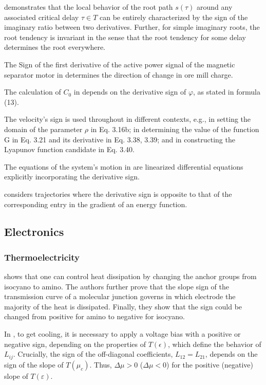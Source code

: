 \documentclass[11pt]{book}
\begin{document}
\cite{jarlebring2010invariance} demonstrates that the local behavior
of the root path $s\left(\tau\right)$ around any associated critical
delay $\tau\in T$ can be entirely characterized by the sign of the
imaginary ratio between two derivatives. Further, for simple imaginary
roots, the root tendency is invariant in the sense that the root tendency
for some delay determines the root everywhere.

The Sign of the first derivative of the active power signal of the
magnetic separator motor in \cite{alekseyev2014automated} determines
the direction of change in ore mill charge.

The calculation of $C_{0}$ in \cite{lumbreras2018stability} depends
on the derivative sign of $\varphi$, as stated in formula (13).

The velocity's sign is used throughout \cite{kikuuwe2018some} in
different contexts, e.g., in setting the domain of the parameter $\rho$
in Eq. 3.16b; in determining the value of the function G in Eq. 3.21
and its derivative in Eq. 3.38, 3.39; and in constructing the Lyapunov
function candidate in Eq. 3.40.

The equations of the system's motion in \cite{romacevych2019closed}
are linearized differential equations explicitly incorporating the
derivative sign.

\cite{hendrickx2019trajectory} considers trajectories where the derivative
sign is opposite to that of the corresponding entry in the gradient
of an energy function.


\subsection{Electronics}


\subsubsection{Thermoelectricity}

\cite{lee2013heat} shows that one can control heat dissipation by
changing the anchor groups from isocyano to amino. The authors further
prove that the slope sign of the transmission curve of a molecular
junction governs in which electrode the majority of the heat is dissipated.
Finally, they show that the sign could be changed from positive for
amino to negative for isocyano.

In \cite{mateos2021thermoelectric}, to get cooling, it is necessary
to apply a voltage bias with a positive or negative sign, depending
on the properties of $T\left(\epsilon\right)$, which define the behavior
of $L_{ij}$. Crucially, the sign of the off-diagonal coefficients,
$L_{12}=L_{21}$, depends on the sign of the slope of $T\left(\mu_{c}\right)$.
Thus, $\Delta\mu>0$ ($\Delta\mu<0$) for the positive (negative)
slope of $T\left(\varepsilon\right)$.
\end{document}
